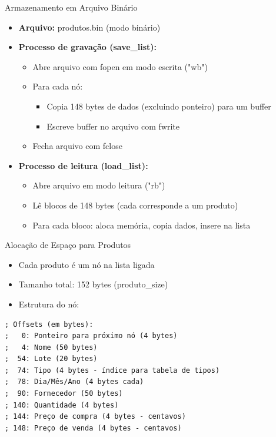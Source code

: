 \documentclass{beamer}
\begin{document}
\begin{frame}{Armazenamento em Arquivo Binário}
    \begin{itemize}
        \item \textbf{Arquivo:} produtos.bin (modo binário)
        \item \textbf{Processo de gravação (save\_list):}
        \begin{itemize}
            \item Abre arquivo com fopen em modo escrita ("wb")
            \item Para cada nó:
            \begin{itemize}
                \item Copia 148 bytes de dados (excluindo ponteiro) para um buffer
                \item Escreve buffer no arquivo com fwrite
            \end{itemize}
            \item Fecha arquivo com fclose
        \end{itemize}
        \item \textbf{Processo de leitura (load\_list):}
        \begin{itemize}
            \item Abre arquivo em modo leitura ("rb")
            \item Lê blocos de 148 bytes (cada corresponde a um produto)
            \item Para cada bloco: aloca memória, copia dados, insere na lista
        \end{itemize}
    \end{itemize}
\end{frame}

\begin{frame}[fragile]{Alocação de Espaço para Produtos}
    \begin{itemize}
        \item Cada produto é um nó na lista ligada
        \item Tamanho total: 152 bytes (produto\_size)
        \item Estrutura do nó:
    \end{itemize}
    \begin{verbatim}
; Offsets (em bytes):
;   0: Ponteiro para próximo nó (4 bytes)
;   4: Nome (50 bytes)
;  54: Lote (20 bytes)
;  74: Tipo (4 bytes - índice para tabela de tipos)
;  78: Dia/Mês/Ano (4 bytes cada)
;  90: Fornecedor (50 bytes)
; 140: Quantidade (4 bytes)
; 144: Preço de compra (4 bytes - centavos)
; 148: Preço de venda (4 bytes - centavos)
    \end{verbatim}
\end{frame}
\end{document}
